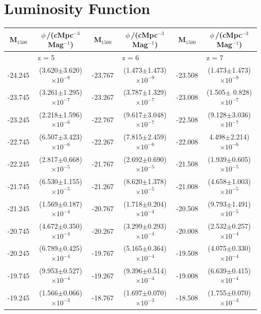 
\section{Luminosity Function}\label{app: lum_func}
\begin{table}
	\centering
	\begin{tabular}[t]{cccccc}
		\hline
		M$_{1500}$ &  $\phi$\,/(cMpc$^{-3}$ Mag$^{-1}$) & M$_{1500}$ &  $\phi$\,/(cMpc$^{-3}$ Mag$^{-1}$) & M$_{1500}$ &  $\phi$\,/(cMpc$^{-3}$ Mag$^{-1}$)\\
		\hline
		\multicolumn{2}{c}{z = 5} & \multicolumn{2}{c}{z = 6} & \multicolumn{2}{c}{z = 7} \\
		\hline
		-24.245 &  (3.620$\pm$3.620)$\times 10^{-8}$ & -23.767 &  (1.473$\pm$1.473)$\times 10^{-9}$ & -23.508 &  (1.473$\pm$1.473)$\times 10^{-9}$ \\
		-23.745 &  (3.261$\pm$1.295)$\times 10^{-7}$ & -23.267 &  (3.787$\pm$1.329)$\times 10^{-7}$ & -23.008 &  (1.505$\pm$  0.828)$\times 10^{-7}$ \\
		-23.245 &  (2.218$\pm$1.596)$\times 10^{-6}$ & -22.767 &  (9.617$\pm$3.048)$\times 10^{-7}$ & -22.508 &  (9.128$\pm$3.036)$\times 10^{-7}$ \\
		-22.745 & (6.507$\pm$3.423)$\times 10^{-6}$ & -22.267 &  (7.815$\pm$2.459)$\times 10^{-6}$ & -22.008 &  4.498$\pm$2.214)$\times 10^{-6}$ \\
		-22.245 &  (2.817$\pm$0.668)$\times 10^{-5}$ & -21.767 &  (2.692$\pm$0.690)$\times 10^{-5}$ & -21.508 &  (1.939$\pm$0.605)$\times 10^{-5}$ \\
		-21.745 &  (6.530$\pm$1.155)$\times 10^{-5}$ & -21.267 &  (8.620$\pm$1.378)$\times 10^{-5}$ & -21.008 &  (4.658$\pm$1.003)$\times 10^{-5}$ \\
		-21.245 &  (1.569$\pm$0.187)$\times 10^{-4}$ & -20.767 &  (1.718$\pm$0.204)$\times 10^{-4}$ & -20.508 &  (9.793$\pm$1.491)$\times 10^{-5}$ \\
		-20.745 &  (4.672$\pm$0.350)$\times 10^{-4}$ & -20.267 &  (3.299$\pm$0.293)$\times 10^{-4}$ & -20.008 &  (2.532$\pm$0.257)$\times 10^{-4}$ \\
		-20.245 &  (6.789$\pm$0.425)$\times 10^{-4}$ & -19.767 &  (5.165$\pm$0.364)$\times 10^{-4}$ & -19.508 &  (4.075$\pm$0.330)$\times 10^{-4}$ \\
		-19.745 &  (9.953$\pm$0.527)$\times 10^{-4}$ & -19.267 &  (9.396$\pm$0.514)$\times 10^{-4}$ & -19.008 &  (6.639$\pm$0.415)$\times 10^{-4}$ \\
		-19.245 &  (1.566$\pm$0.066)$\times 10^{-3}$ & -18.767 &  (1.697$\pm$0.070)$\times 10^{-3}$ & -18.508 &  (1.755$\pm$0.070)$\times 10^{-3}$ \\

\end{tabular}
\end{table}
